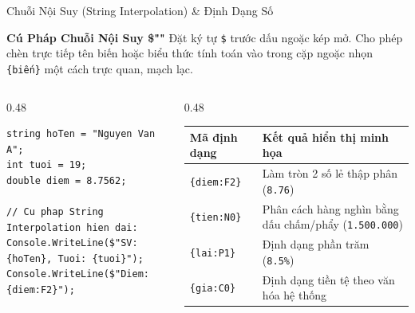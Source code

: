 \documentclass[aspectratio=169, 10pt]{beamer}
\begin{document}
\begin{frame}[fragile]{Chuỗi Nội Suy (String Interpolation) \& Định Dạng Số}
  \begin{block}{\textbf{Cú Pháp Chuỗi Nội Suy \$""}}
    Đặt ký tự \texttt{\$} trước dấu ngoặc kép mở. Cho phép chèn trực tiếp tên biến hoặc biểu thức tính toán vào trong cặp ngoặc nhọn \texttt{\{biến\}} một cách trực quan, mạch lạc.
  \end{block}
  \begin{columns}[T]
    \begin{column}{0.48\textwidth}
\begin{lstlisting}
string hoTen = "Nguyen Van A";
int tuoi = 19;
double diem = 8.7562;

// Cu phap String Interpolation hien dai:
Console.WriteLine($"SV: {hoTen}, Tuoi: {tuoi}");
Console.WriteLine($"Diem: {diem:F2}");
\end{lstlisting}
    \end{column}
    \begin{column}{0.48\textwidth}
      \begin{table}[h]
        \centering
        \scriptsize
        \begin{tabularx}{\textwidth}{lX}
          \toprule
          \textbf{Mã định dạng} & \textbf{Kết quả hiển thị minh họa} \\
          \midrule
          \texttt{\{diem:F2\}} & Làm tròn 2 số lẻ thập phân (\texttt{8.76}) \\
          \addlinespace
          \texttt{\{tien:N0\}} & Phân cách hàng nghìn bằng dấu chấm/phẩy (\texttt{1.500.000}) \\
          \addlinespace
          \texttt{\{lai:P1\}} & Định dạng phần trăm (\texttt{8.5\%}) \\
          \addlinespace
          \texttt{\{gia:C0\}} & Định dạng tiền tệ theo văn hóa hệ thống \\
          \bottomrule
        \end{tabularx}
      \end{table}
    \end{column}
  \end{columns}
\end{frame}
\end{document}
